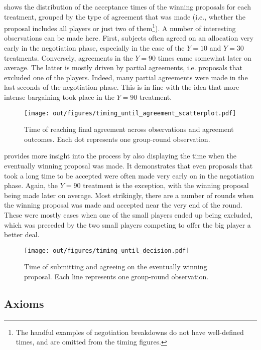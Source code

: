  shows the distribution of the acceptance times of the winning proposals for each treatment, grouped by the type of agreement that was made (i.e., whether the proposal includes all players or just two of them\footnote{The handful examples of negotiation breakdowns do not have well-defined times, and are omitted from the timing figures.}). A number of interesting observations can be made here. First, subjects often agreed on an allocation very early in the negotiation phase, especially in the case of the $Y=10$ and $Y=30$ treatments. Conversely, agreements in the $Y=90$ times came somewhat later on average. The latter is mostly driven by partial agreements, i.e. proposals that excluded one of the players. Indeed, many partial agreements were made in the last seconds of the negotiation phase. This is in line with the idea that more intense bargaining took place in the $Y=90$ treatment.

\begin{figure}
    \centering
    \texttt{[image: out/figures/timing\_until\_agreement\_scatterplot.pdf]}
    \caption{Time of reaching final agreement across observations and agreement outcomes. Each dot represents one group-round observation.}
    \label{fig:timing_scatterplot}
\end{figure}

 provides more insight into the process by also displaying the time when the eventually winning proposal was made. It demonstrates that even proposals that took a long time to be accepted were often made very early on in the negotiation phase. Again, the $Y=90$ treatment is the exception, with the winning proposal being made later on average. Most strikingly, there are a number of rounds when the winning proposal was made and accepted near the very end of the round. These were mostly cases when one of the small players ended up being excluded, which was preceded by the two small players competing to offer the big player a better deal.

\begin{figure}
    \centering
    \texttt{[image: out/figures/timing\_until\_decision.pdf]}
    \caption{Time of submitting and agreeing on the eventually winning proposal. Each line represents one group-round observation.}
    \label{fig:timing_lines}
\end{figure}



\subsection{Axioms}

